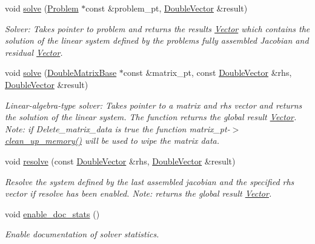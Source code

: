 \begin{DoxyCompactItemize}
void \hyperlink{classoomph_1_1SuperLUSolver_a5a121df89c72a8741d051aa176b12255}{solve} (\hyperlink{classoomph_1_1Problem}{Problem} $\ast$const \&problem\+\_\+pt, \hyperlink{classoomph_1_1DoubleVector}{Double\+Vector} \&result)
\begin{DoxyCompactList}\small\item\em Solver\+: Takes pointer to problem and returns the results \hyperlink{classoomph_1_1Vector}{Vector} which contains the solution of the linear system defined by the problem\textquotesingle{}s fully assembled Jacobian and residual \hyperlink{classoomph_1_1Vector}{Vector}. \end{DoxyCompactList}\item 
void \hyperlink{classoomph_1_1SuperLUSolver_a94e94a44f4cb93f2adf035e9b99990e7}{solve} (\hyperlink{classoomph_1_1DoubleMatrixBase}{Double\+Matrix\+Base} $\ast$const \&matrix\+\_\+pt, const \hyperlink{classoomph_1_1DoubleVector}{Double\+Vector} \&rhs, \hyperlink{classoomph_1_1DoubleVector}{Double\+Vector} \&result)
\begin{DoxyCompactList}\small\item\em Linear-\/algebra-\/type solver\+: Takes pointer to a matrix and rhs vector and returns the solution of the linear system. The function returns the global result \hyperlink{classoomph_1_1Vector}{Vector}. Note\+: if Delete\+\_\+matrix\+\_\+data is true the function matrix\+\_\+pt-\/$>$\hyperlink{classoomph_1_1SuperLUSolver_aec78b96a8f831a89f9b8fb48b1ce0c68}{clean\+\_\+up\+\_\+memory()} will be used to wipe the matrix data. \end{DoxyCompactList}\item 
void \hyperlink{classoomph_1_1SuperLUSolver_acef6e1b3bf469061777866d97689ba77}{resolve} (const \hyperlink{classoomph_1_1DoubleVector}{Double\+Vector} \&rhs, \hyperlink{classoomph_1_1DoubleVector}{Double\+Vector} \&result)
\begin{DoxyCompactList}\small\item\em Resolve the system defined by the last assembled jacobian and the specified rhs vector if resolve has been enabled. Note\+: returns the global result \hyperlink{classoomph_1_1Vector}{Vector}. \end{DoxyCompactList}\item 
void \hyperlink{classoomph_1_1SuperLUSolver_a3eca8399eb777ea97eaad15383eb5795}{enable\+\_\+doc\+\_\+stats} ()
\begin{DoxyCompactList}\small\item\em Enable documentation of solver statistics. \end{DoxyCompactList}\item 

\end{DoxyCompactItemize}
